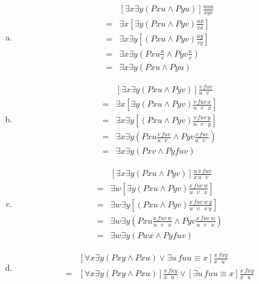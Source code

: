 \begin{enumerate}[1.]
\begin{enumerate}[(a)]
\item
\[
\begin{array}{ll}
\, & [ \exists x \exists y ( Pxu \land Pyu ) ] \frac{uuu}{xyv} \\
= & \exists x [ \exists y ( Pxu \land Pyv ) \frac{ux}{vx} ] \\
= & \exists x \exists y [ ( Pxu \land Pyv ) \frac{uy}{vy} ] \\
= & \exists x \exists y ( Pxu \frac{u}{v} \land Pyv \frac{u}{v} ) \\
= & \exists x \exists y ( Pxu \land Pyu )
\end{array}
\]
\item
\[
\begin{array}{ll}
\, & [ \exists x \exists y ( Pxu \land Pyv ) ] \frac{v\,fuv}{u\,\phantom{f}v\phantom{u}} \\
= & \exists x [ \exists y ( Pxu \land Pyv ) \frac{v\,fuv\,x}{u\,\phantom{f}v\phantom{u}\,x} ] \\
= & \exists x \exists y [ ( Pxu \land Pyv ) \frac{v\,fuv\,y}{u\,\phantom{f}v\phantom{u}\,y} ] \\
= & \exists x \exists y ( Pxu \frac{v\,fuv}{u\,\phantom{f}v\phantom{u}} \land Pyv \frac{v\,fuv}{u\,\phantom{f}v\phantom{u}} ) \\
= & \exists x \exists y ( Pxv \land Pyfuv )
\end{array}
\]
\item
\[
\begin{array}{ll}
\, & [ \exists x \exists y ( Pxu \land Pyv ) ] \frac{u\,x\,fuv}{x\,u\,\phantom{f}v\phantom{u}} \\
= & \exists w [ \exists y ( Pxu \land Pyv ) \frac{x\,fuv\,w}{u\,\phantom{f}v\phantom{u}\,x} ] \\
= & \exists w \exists y [ ( Pxu \land Pyv ) \frac{x\,fuv\,w\,y}{u\,\phantom{f}v\phantom{u}\,x\,y} ] \\
= & \exists w \exists y ( Pxu \frac{x\,fuv\,w}{u\,\phantom{f}v\phantom{u}\,x} \land Pyv \frac{x\,fuv\,w}{u\,\phantom{f}v\phantom{u}\,x} ) \\
= & \exists w \exists y ( Pwx \land Pyfuv )
\end{array}
\]
\item
\[
\begin{array}{ll}
\, & [ \forall x \exists y ( Pxy \land Pxu ) \lor \exists u \, fuu \equiv x ] \frac{x\,fxy}{x\,\phantom{f}u\phantom{y}} \\
= & [ \forall x \exists y ( Pxy \land Pxu ) ] \frac{x\,fxy}{x\,\phantom{f}u\phantom{y}} \lor [ \exists u \, fuu \equiv x ] \frac{x\,fxy}{x\,\phantom{f}u\phantom{y}} \\

\end{array}\]
\end{enumerate}
\end{enumerate}
